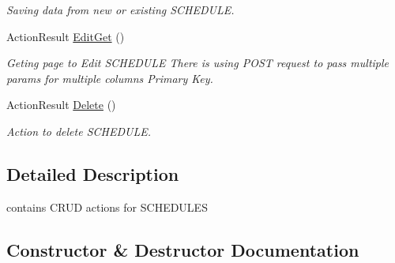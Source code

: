 \begin{DoxyCompactItemize}
\begin{DoxyCompactList}\small\item\em Saving data from new or existing S\+C\+H\+E\+D\+U\+LE. \end{DoxyCompactList}\item 
Action\+Result \hyperlink{class_in_study_asp_1_1_controllers_1_1_user_1_1_teacher_1_1_task_controller_ae766a4b260974a72ef400f12e1c9afed}{Edit\+Get} ()
\begin{DoxyCompactList}\small\item\em Geting page to Edit S\+C\+H\+E\+D\+U\+LE There is using P\+O\+ST request to pass multiple params for multiple columns Primary Key. \end{DoxyCompactList}\item 
Action\+Result \hyperlink{class_in_study_asp_1_1_controllers_1_1_user_1_1_teacher_1_1_task_controller_af96d0db6c6f1f3b3942b4fff837d63b2}{Delete} ()
\begin{DoxyCompactList}\small\item\em Action to delete S\+C\+H\+E\+D\+U\+LE. \end{DoxyCompactList}\end{DoxyCompactItemize}


\subsection{Detailed Description}
contains C\+R\+UD actions for S\+C\+H\+E\+D\+U\+L\+ES 

\subsection{Constructor \& Destructor Documentation}
\mbox{\label{class_in_study_asp_1_1_controllers_1_1_user_1_1_teacher_1_1_task_controller_aa263231cb68f3b2bf018d0bef50034f6}} 
